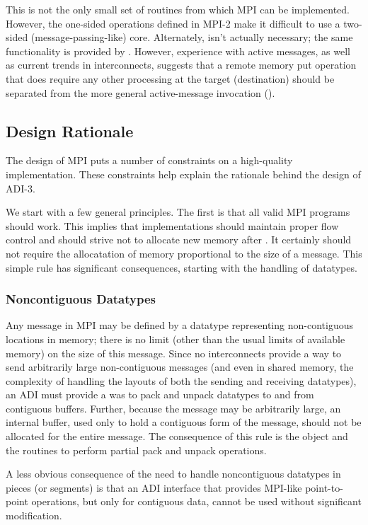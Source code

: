 \documentclass{article}
\begin{document}
This is not the only small set of routines from which MPI can be
implemented.  However, the one-sided operations defined in MPI-2 make
it difficult to use a two-sided (message-passing-like) core.
Alternately,  isn't actually necessary; the same
functionality is provided by .  However, experience
with active messages, as well as current trends in interconnects,
suggests that a remote memory put operation that does require any
other processing at the target (destination) should be separated from
the more general active-message invocation ().

\subsection{Design Rationale}
\label{sec-intermediate}
The design of MPI puts a number of constraints on a high-quality
implementation.  These constraints help explain the rationale behind
the design of ADI-3.

We start with a few general principles.  The first is that all valid
MPI programs should work.  This implies that implementations should
maintain proper flow control and should strive not to allocate new
memory after .  It certainly should not require
the allocatation of memory proportional to the size of a message.
This simple rule has significant consequences, starting with the
handling of datatypes.

\subsubsection{Noncontiguous Datatypes}
Any message in MPI may be defined by a datatype representing
non-contiguous locations in memory; there is no limit (other than the
usual limits of available memory) on the size of this message.  Since
no interconnects provide a way to send arbitrarily large
non-contiguous messages (and even in shared memory, the complexity of
handling the layouts of both the sending and receiving datatypes), an
ADI must provide a was to pack and unpack datatypes to and from
contiguous buffers.  
Further, because the message may be arbitrarily large, an internal
buffer,
used only to hold a contiguous form of the message, should
not be allocated for the entire message.
The consequence of this rule is the  object and the
routines to perform partial pack and unpack operations.

A less obvious consequence of the need to handle noncontiguous
datatypes in pieces (or segments) is that an ADI interface that
provides MPI-like point-to-point operations, but only for contiguous
data, cannot be used without significant modification.  
\end{document}
